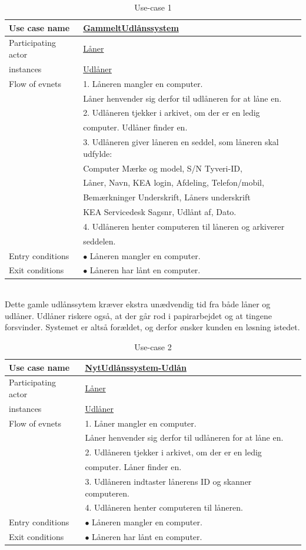 \documentclass[a4paper]{article}
\begin{document}
\begin{table}[h]
\caption{Use-case 1}
\begin{tabular}{ll}
Use case name               & \underline{GammeltUdlånssystem} \\ \hline
Participating actor           & \underline{Låner} \\
instances                     & \underline{Udlåner} \\ \hline
Flow of evnets                & 1. Låneren mangler en computer.\\& Låner henvender sig derfor til udlåneren for at låne en.
\\& 2. Udlåneren tjekker i arkivet, om der er en ledig \\& computer. Udlåner finder en.
\\& 3. Udlåneren giver låneren en seddel, som låneren skal udfylde: \\& Computer Mærke og model, S/N Tyveri-ID, \\& Låner, Navn, KEA login, Afdeling, Telefon/mobil, \\& Bemærkninger Underskrift, Låners underskrift \\& KEA Servicedesk Sagsnr, Udlånt af, Dato.
\\& 4. Udlåneren henter computeren til låneren og arkiverer
\\& seddelen.\\ \hline
Entry conditions & $\bullet$ Låneren mangler en computer. \\ \hline
Exit conditions  & $\bullet$ Låneren har lånt en computer. 
\end{tabular}
\end{table} \\
Dette gamle udlånssytem kræver ekstra unædvendig tid fra både låner og udlåner. Udlåner riskere også, at der går rod i papirarbejdet og at tingene forsvinder. Systemet er altså forældet, og derfor ønsker kunden en løsning istedet. \\
\begin{table}[h]
\caption{Use-case 2}
\begin{tabular}{ll}
Use case name             & \underline{NytUdlånssystem-Udlån} \\ \hline
Participating actor           & \underline{Låner} \\
instances                     & \underline{Udlåner}\\ \hline
Flow of evnets                & 1. Låner mangler en computer.	\\& Låner henvender sig derfor til udlåneren for at låne en.
\\& 2. Udlåneren tjekker i arkivet, om der er en ledig \\& computer. Låner finder en.
\\& 3. Udlåneren indtaster lånerens ID og skanner computeren.
\\& 4. Udlåneren henter computeren til låneren.\\ \hline
Entry conditions & $\bullet$ Låneren mangler en computer. \\ \hline
Exit conditions  & $\bullet$ Låneren har lånt en computer. 
\end{tabular}
\end{table}\\
\end{document}
